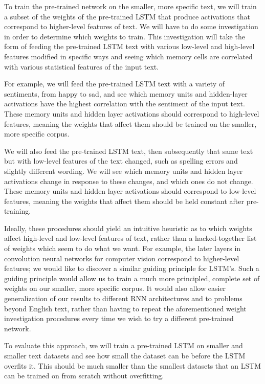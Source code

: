 \documentclass[10pt,twocolumn,letterpaper]{article}
\begin{document}
	To train the pre-trained network on the smaller, more specific text, we will train a subset of the weights of the pre-trained LSTM that produce activations that correspond to higher-level features of text. We will have to do some investigation in order to determine which weights to train. This investigation will take the form of feeding the pre-trained LSTM text with various low-level and high-level features modified in specific ways and seeing which memory cells are correlated with various statistical features of the input text.
	
	For example, we will feed the pre-trained LSTM text with a variety of sentiments, from happy to sad, and see which memory units and hidden-layer activations have the highest correlation with the sentiment of the input text. These memory units and hidden layer activations should correspond to high-level features, meaning the weights that affect them should be trained on the smaller, more specific corpus.
	
	We will also feed the pre-trained LSTM text, then subsequently that same text but with low-level features of the text changed, such as spelling errors and slightly different wording. We will see which memory units and hidden layer activations change in response to these changes, and which ones do not change. These memory units and hidden layer activations should correspond to low-level features, meaning the weights that affect them should be held constant after pre-training.
	
	Ideally, these procedures should yield an intuitive heuristic as to which weights affect high-level and low-level features of text, rather than a hacked-together list of weights which seem to do what we want. For example, the later layers in convolution neural networks for computer vision correspond to higher-level features; we would like to discover a similar guiding principle for LSTM's. Such a guiding principle would allow us to train a much more principled, complete set of weights on our smaller, more specific corpus. It would also allow easier generalization of our results to different RNN architectures and to problems beyond English text, rather than having to repeat the aforementioned weight investigation procedures every time we wish to try a different pre-trained network.
	
	To evaluate this approach, we will train a pre-trained LSTM on smaller and smaller text datasets and see how small the dataset can be before the LSTM overfits it. This should be much smaller than the smallest datasets that an LSTM can be trained on from scratch without overfitting.
	
\end{document}
